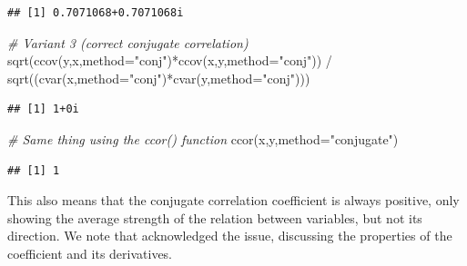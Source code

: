 \documentclass[
]{book}
\newenvironment{Shaded}{\begin{snugshade}}{\end{snugshade}}
\newcommand{\AttributeTok}[1]{\textcolor[rgb]{0.77,0.63,0.00}{#1}}
\newcommand{\CommentTok}[1]{\textcolor[rgb]{0.56,0.35,0.01}{\textit{#1}}}
\newcommand{\FunctionTok}[1]{\textcolor[rgb]{0.00,0.00,0.00}{#1}}
\newcommand{\NormalTok}[1]{#1}
\newcommand{\SpecialCharTok}[1]{\textcolor[rgb]{0.00,0.00,0.00}{#1}}
\newcommand{\StringTok}[1]{\textcolor[rgb]{0.31,0.60,0.02}{#1}}
\begin{document}
\begin{verbatim}
## [1] 0.7071068+0.7071068i
\end{verbatim}

\begin{Shaded}
\begin{Highlighting}[]
\CommentTok{\# Variant 3 (correct conjugate correlation)}
\FunctionTok{sqrt}\NormalTok{(}\FunctionTok{ccov}\NormalTok{(y,x,}\AttributeTok{method=}\StringTok{"conj"}\NormalTok{)}\SpecialCharTok{*}\FunctionTok{ccov}\NormalTok{(x,y,}\AttributeTok{method=}\StringTok{"conj"}\NormalTok{)) }\SpecialCharTok{/}
    \FunctionTok{sqrt}\NormalTok{((}\FunctionTok{cvar}\NormalTok{(x,}\AttributeTok{method=}\StringTok{"conj"}\NormalTok{)}\SpecialCharTok{*}\FunctionTok{cvar}\NormalTok{(y,}\AttributeTok{method=}\StringTok{"conj"}\NormalTok{)))}
\end{Highlighting}
\end{Shaded}

\begin{verbatim}
## [1] 1+0i
\end{verbatim}

\begin{Shaded}
\begin{Highlighting}[]
\CommentTok{\# Same thing using the ccor() function}
\FunctionTok{ccor}\NormalTok{(x,y,}\AttributeTok{method=}\StringTok{"conjugate"}\NormalTok{)}
\end{Highlighting}
\end{Shaded}

\begin{verbatim}
## [1] 1
\end{verbatim}

This also means that the conjugate correlation coefficient is always positive, only showing the average strength of the relation between variables, but not its direction. We note that \citet{Schreier2010} acknowledged the issue, discussing the properties of the coefficient and its derivatives.
\end{document}
